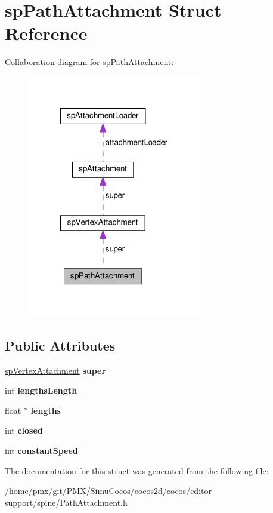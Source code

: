 \hypertarget{structspPathAttachment}{}\section{sp\+Path\+Attachment Struct Reference}
\label{structspPathAttachment}


Collaboration diagram for sp\+Path\+Attachment\+:
\nopagebreak
\begin{figure}[H]
\begin{center}
\leavevmode
\includegraphics[width=216pt]{structspPathAttachment__coll__graph}
\end{center}
\end{figure}
\subsection*{Public Attributes}
\begin{DoxyCompactItemize}
\item 
\mbox{\label{structspPathAttachment_ab93f3c16a21890823a186867fbfedba1}} 
\hyperlink{structspVertexAttachment}{sp\+Vertex\+Attachment} {\bfseries super}
\item 
\mbox{\label{structspPathAttachment_adcd19e40f8a587b65fe7e6160023f18d}} 
int {\bfseries lengths\+Length}
\item 
\mbox{\label{structspPathAttachment_aebdebb6f52ac608c8f610a714f509bca}} 
float $\ast$ {\bfseries lengths}
\item 
\mbox{\label{structspPathAttachment_aa0a94fc17484f96e96b99bd950dea3d6}} 
int {\bfseries closed}
\item 
\mbox{\label{structspPathAttachment_a5898e9ac2924e4c6070be36d4d4419cc}} 
int {\bfseries constant\+Speed}
\end{DoxyCompactItemize}


The documentation for this struct was generated from the following file\+:\begin{DoxyCompactItemize}
\item 
/home/pmx/git/\+P\+M\+X/\+Simu\+Cocos/cocos2d/cocos/editor-\/support/spine/Path\+Attachment.\+h\end{DoxyCompactItemize}
